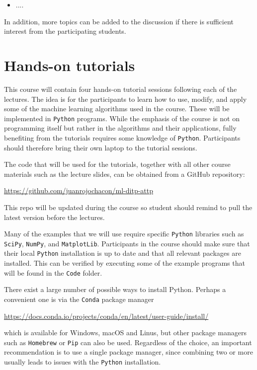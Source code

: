 \documentclass[12pt]{article}
\numberwithin{equation}{section}
\begin{document}
\begin{spacing}{1.1}
\begin{itemize}
\item ....  
  
\end{itemize}
  
In addition, more topics can be added to the discussion if there is sufficient
interest from the participating students.


\section{Hands-on tutorials}

This course will contain four hands-on tutorial sessions following each
of the lectures.
%
The idea is for the participants to learn how to use, modify, and apply
some of the machine learning algorithms used in the course.
%
These will be implemented in {\tt Python} programs.
%
While the emphasis of the course is not on programming itself but rather
in the algorithms and their applications, fully benefiting from the tutorials
requires some knowledge of {\tt Python}.
%
Participants should therefore bring their own laptop to the tutorial sessions.

The code that will be used for the tutorials, together with all other course
materials such as the lecture slides, can be obtained from a GitHub
repository:
\begin{center}
  \url{https://github.com/juanrojochacon/ml-ditp-attp}
\end{center}
This repo will be updated during the course so student should remind to
pull the latest version before the lectures.

Many of the examples that we will use require specific {\tt Python} libraries
such as {\tt SciPy}, {\tt NumPy}, and {\tt  MatplotLib}.
%
Participants in the course should make sure that their local {\tt Python}
installation is up to date and that all relevant packages are installed.
%
This can be verified by executing some of the example programs that
will be found in the {\tt Code} folder.

There exist a large number of possible ways to install Python.
%
Perhaps a convenient one is via the {\tt Conda} package manager
\begin{center}
\url{https://docs.conda.io/projects/conda/en/latest/user-guide/install/}
\end{center}
which is available for Windows, macOS and Linus, but other package managers
such as {\tt Homebrew} or {\tt Pip} can also be used.
%
Regardless of the choice, an important recommendation is to use a single
package manager, since combining two or more usually leads to issues
with the {\tt Python} installation.


\end{spacing}
\end{document}
